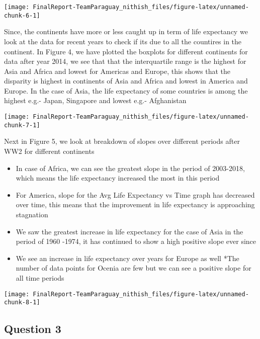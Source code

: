 \documentclass[]{article}
\providecommand{\tightlist}{%
  \setlength{\itemsep}{0pt}\setlength{\parskip}{0pt}}
\begin{document}
\begin{center}\texttt{[image: FinalReport-TeamParaguay\_nithish\_files/figure-latex/unnamed-chunk-6-1]} \end{center}

Since, the continents have more or less caught up in term of life
expectancy we look at the data for recent years to check if its due to
all the countires in the continent. In Figure 4, we have plotted the
boxplots for different continents for data after year 2014, we see that
that the interquartile range is the highest for Asia and Africa and
lowest for Americas and Europe, this shows that the disparity is highest
in continents of Asia and Africa and lowest in America and Europe. In
the case of Asia, the life expectancy of some countries is among the
highest e.g.- Japan, Singapore and lowest e.g.- Afghanistan

\begin{center}\texttt{[image: FinalReport-TeamParaguay\_nithish\_files/figure-latex/unnamed-chunk-7-1]} \end{center}

Next in Figure 5, we look at breakdown of slopes over different periods
after WW2 for different continents

\begin{itemize}
\tightlist
\item
  In case of Africa, we can see the greatest slope in the period of
  2003-2018, which means the life expectancy increased the most in this
  period
\item
  For America, slope for the Avg Life Expectancy vs Time graph has
  decreased over time, this means that the improvement in life
  expectancy is approaching stagnation
\item
  We saw the greatest increase in life expectancy for the case of Asia
  in the period of 1960 -1974, it has continued to show a high positive
  slope ever since
\item
  We see an increase in life expectancy over years for Europe as well
  *The number of data points for Ocenia are few but we can see a
  positive slope for all time periods
\end{itemize}

\begin{center}\texttt{[image: FinalReport-TeamParaguay\_nithish\_files/figure-latex/unnamed-chunk-8-1]} \end{center}

\hypertarget{question-3}{%
\subsection{Question 3}\label{question-3}}
\end{document}
